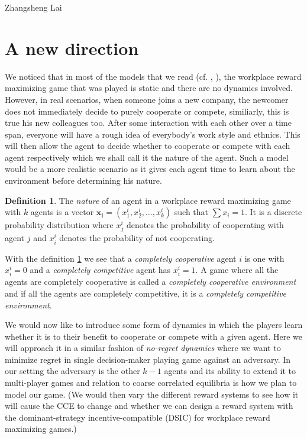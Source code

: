 \documentclass[a4paper,10pt]{article}
\theoremstyle{definition}
\newtheorem{defn}[thm]{Definition}
\begin{document}
\begin{flushright}
Zhangsheng Lai
\end{flushright}

\section*{A new direction}
We noticed that in most of the models that we read (cf.  \cite{Drago1991}, \cite{Chakravarti2015}), the workplace reward maximizing game that was played is static and there are no dynamics involved. However, in real scenarios, when someone joins a new company, the newcomer does not immediately decide to purely cooperate or compete, similiarly, this is true his new colleagues too. After some interaction with each other over a time span, everyone will have a rough idea of everybody's work style and ethnics. This will then allow the agent to decide whether to cooperate or compete with each agent respectively which we shall call it the nature of the agent. Such a model would be a more realistic scenario as it gives each agent time to learn about the environment before determining his nature. 

\begin{defn}
The \emph{nature} of an agent in a workplace reward maximizing game with $k$ agents is a vector $\mathbf{x_i}=(x^i_1,x^i_2,\ldots, x^i_k)$ such that $\sum x_i=1$. It is a discrete probability distribution where $x^i_j$ denotes the probability of cooperating with agent $j$ and $x^i_i$ denotes the probability of not cooperating. \label{def:nature}
\end{defn}

With the definition \ref{def:nature} we see that a \emph{completely cooperative} agent $i$ is one with $x^i_i=0$ and a \emph{completely competitive} agent has $x^i_i=1$. A game where all the agents are completely cooperative is called a \emph{completely cooperative environment} and if all the agents are completely competitive, it is a \emph{completely competitive environment}.

We would now like to introduce some form of dynamics in which the players learn whether it is to their benefit to cooperate or compete with a given agent. Here we will approach it in a similar fashion of \emph{no-regret dynamics} where we want to minimize regret in single decision-maker playing game against an adversary. In our setting the adversary is the other $k-1$ agents and its ability to extend it to multi-player games and relation to coarse correlated equilibria is how we plan to model our game. (We would then vary the different reward systems to see how it will cause the CCE to change and whether we can design a reward system with the dominant-strategy incentive-compatible (DSIC) for workplace reward maximizing games.)
\end{document}
